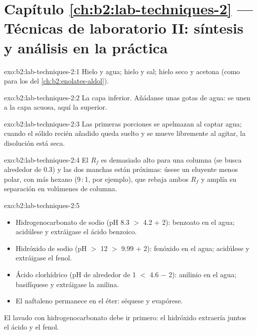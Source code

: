 \section*{Capítulo \ref{ch:b2:lab-techniques-2} --- Técnicas de laboratorio II: síntesis y análisis en la práctica}

\begin{solution}{exo:b2:lab-techniques-2:1}
Hielo y agua; hielo y sal; hielo seco y acetona (como para los  del \cref{ch:b2:enolates-aldol}).
\end{solution}

\begin{solution}{exo:b2:lab-techniques-2:2}
La capa inferior. Añádanse unas gotas de agua: se unen a la capa acuosa, aquí la superior.
\end{solution}

\begin{solution}{exo:b2:lab-techniques-2:3}
Las primeras porciones se apelmazan al captar agua; cuando el sólido recién añadido queda suelto y se mueve libremente
al agitar, la disolución está seca.
\end{solution}

\begin{solution}{exo:b2:lab-techniques-2:4}
El $R_f$ es demasiado alto para una columna (se busca alrededor de 0.3) y las dos manchas están próximas: úsese un eluyente
menos polar, con más hexano (9\,:\,1, por ejemplo), que rebaja ambos $R_f$ y amplía su separación en
volúmenes de columna.
\end{solution}

\begin{solution}{exo:b2:lab-techniques-2:5}
\begin{itemize}
  \item Hidrogenocarbonato de sodio (pH 8.3 $>$ 4.2 + 2): benzoato en el agua; acidúlese y extráigase el ácido benzoico.
  \item Hidróxido de sodio (pH $>$ 12 $>$ 9.99 + 2): fenóxido en el agua; acidúlese y extráigase el fenol.
  \item Ácido clorhídrico (pH de alrededor de 1 $<$ 4.6 $-$ 2): anilinio en el agua; basifíquese y extráigase la anilina.
  \item El naftaleno permanece en el éter: séquese y evapórese.
\end{itemize}
El lavado con hidrogenocarbonato debe ir primero: el hidróxido extraería juntos el ácido y el fenol.
\end{solution}

